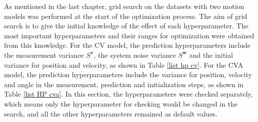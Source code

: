 As mentioned in the last chapter, grid search on the datasets with two motion models was performed at the start of the optimization process. The aim of grid search is to give the initial knowledge of the effect of each hyperparameter. The most important hyperparameters and their ranges for optimization were obtained from this knowledge. For the CV model, the prediction hyperparameters include the measurement variance $S^{\boldsymbol{v}}$, the system noise variance $S^{\boldsymbol{w}}$ and the initial variance for position and velocity, as shown in Table \ref{list hp cv}. For the CVA model, the prediction hyperparameters include the variance for position, velocity and angle in the measurement, prediction and initialization steps, as shown in Table \ref{list HP cva}. In this section, the hyperparameters were checked separately, which means only the hyperparameter for checking would be changed in the search, and all the other hyperparameters remained as default values.



 



